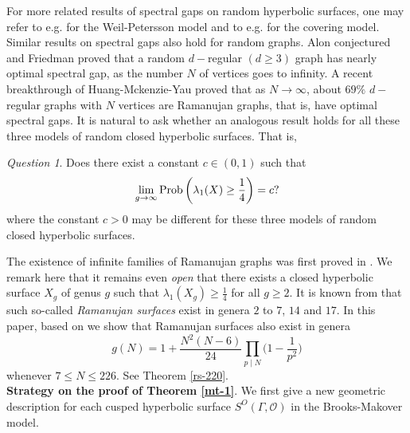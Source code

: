 \documentclass{amsart}
\theoremstyle{plain}
\theoremstyle{definition}
\theoremstyle{remark}
\newtheorem{que}{Question}
\begin{document}
For more related results of spectral gaps on random hyperbolic surfaces, one may refer to e.g. \cite{Hide23,HT25,SW25} for the Weil-Petersson model and to e.g. \cite{MN20,HM23,LM25} for the covering model. Similar results on spectral gaps also hold for random graphs. Alon \cite{Alon86} conjectured and Friedman \cite{Fr08} proved that a random $d-$regular $(d\geq 3)$ graph has nearly optimal spectral gap, as the number $N$ of vertices goes to infinity.  A recent breakthrough of Huang-Mckenzie-Yau \cite{HMY25} proved that as $N\to\infty$, about $69\%$ $d-$regular graphs with $N$ vertices are Ramanujan graphs, that is, have optimal spectral gaps. It is natural to ask whether an analogous result holds for all these three models of random closed hyperbolic surfaces. That is, 
\begin{que}
Does there exist a constant $c\in (0,1)$ such that 
$$\lim\limits_{g\to\infty}\textnormal{Prob}\left(\lambda_1(X)\geq\frac{1}{4}\right)=c?$$
\noindent where the constant $c>0$ may be different for these three models of random closed hyperbolic surfaces. 
\end{que}
The existence of infinite families of Ramanujan graphs was first proved in \cite{LPS88, Mar88, MSS15}. We remark here that it remains even \emph{open} that there exists a closed hyperbolic surface $X_g$ of genus $g$ such that $\lambda_1(X_g)\geq \frac{1}{4}$ for all $g\geq 2$. It is known from \cite{SU2013,Cook2018,BP2023} that such so-called \emph{Ramanujan surfaces} exist in genera $2$ to $7$, $14$ and $17$. In this paper, based on \cite{BLS2020} we show that Ramanujan surfaces also exist in genera \begin{equation*}
    g(N) = 1 + \frac{N^2 (N-6)}{24} \prod_{p\mid N}\Big(1 - \frac{1}{p^2}\Big)
\end{equation*}
whenever $7\leq N\leq 226$. See Theorem \ref{rs-220}.\\



\noindent\textbf{Strategy on the proof of Theorem \ref{mt-1}}.
We first give a new geometric description for each cusped hyperbolic surface $S^O(\Gamma,\mathcal{O})$ in the Brooks-Makover model.
\end{document}
